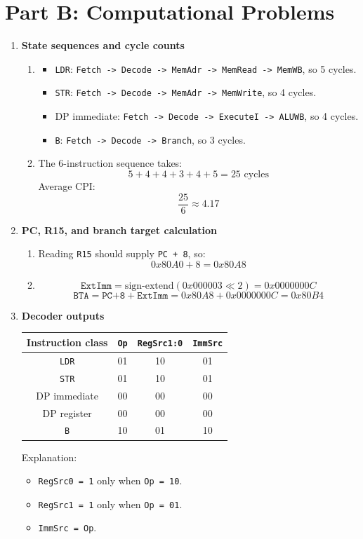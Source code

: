 \documentclass[11pt]{article}
\begin{document}
\section*{Part B: Computational Problems}
\begin{enumerate}[label=\textbf{B\arabic*.}]
  \item \textbf{State sequences and cycle counts}
  \begin{enumerate}[label=(\alph*)]
    \item
    \begin{itemize}[leftmargin=1.5em]
      \item \texttt{LDR}: \texttt{Fetch -> Decode -> MemAdr -> MemRead -> MemWB}, so 5 cycles.
      \item \texttt{STR}: \texttt{Fetch -> Decode -> MemAdr -> MemWrite}, so 4 cycles.
      \item DP immediate: \texttt{Fetch -> Decode -> ExecuteI -> ALUWB}, so 4 cycles.
      \item \texttt{B}: \texttt{Fetch -> Decode -> Branch}, so 3 cycles.
    \end{itemize}
    \item The 6-instruction sequence takes:
    \[
      5 + 4 + 4 + 3 + 4 + 5 = 25 \text{ cycles}
    \]
    Average CPI:
    \[
      \frac{25}{6} \approx 4.17
    \]
  \end{enumerate}

  \item \textbf{PC, R15, and branch target calculation}
  \begin{enumerate}[label=(\alph*)]
    \item Reading \texttt{R15} should supply \texttt{PC + 8}, so:
    \[
      0x80A0 + 8 = 0x80A8
    \]
    \item
    \[
      \texttt{ExtImm} = \text{sign-extend}(0x000003 \ll 2) = 0x0000000C
    \]
    \[
      \texttt{BTA} = \texttt{PC+8} + \texttt{ExtImm} = 0x80A8 + 0x0000000C = 0x80B4
    \]
  \end{enumerate}

  \item \textbf{Decoder outputs}
  \begin{center}
  \begin{tabular}{c|c|c|c}
  Instruction class & \texttt{Op} & \texttt{RegSrc1:0} & \texttt{ImmSrc} \\ \hline
  \texttt{LDR} & 01 & 10 & 01 \\
  \texttt{STR} & 01 & 10 & 01 \\
  DP immediate & 00 & 00 & 00 \\
  DP register & 00 & 00 & 00 \\
  \texttt{B} & 10 & 01 & 10 \\
  \end{tabular}
  \end{center}
  Explanation:
  \begin{itemize}[leftmargin=1.5em]
    \item \texttt{RegSrc0 = 1} only when \texttt{Op = 10}.
    \item \texttt{RegSrc1 = 1} only when \texttt{Op = 01}.
    \item \texttt{ImmSrc = Op}.
  \end{itemize}


\end{enumerate}
\end{document}
